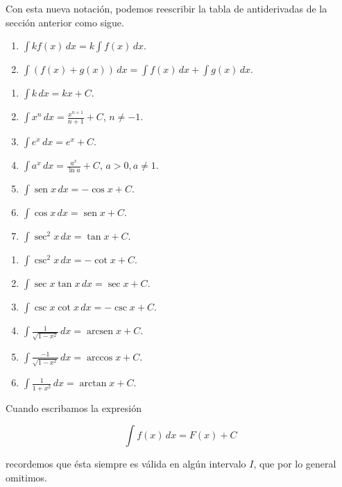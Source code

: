 \documentclass[
  letterpaper,
]{book}
\theoremstyle{plain}
\theoremstyle{remark}
\begin{document}
Con esta nueva notación, podemos reescribir la tabla de antiderivadas de
la sección anterior como sigue.

\label{form-int-indefinidas}
\begin{enumerate}
\def\labelenumi{\arabic{enumi}.}
\item
  \(\displaystyle \int kf(x)\,dx=k\int f(x)\, dx\).
\item
  \(\displaystyle \int (f(x)+g(x))\,dx=\int f(x)\, dx+\int g(x)\,dx\).
\end{enumerate}

\begin{enumerate}
\def\labelenumi{\arabic{enumi}.}
\setcounter{enumi}{2}
\item
  \(\displaystyle \int k\,dx=kx+C\).
\item
  \(\displaystyle \int x^n\,dx=\frac{x^{n+1}}{n+1}+C\), \(n\neq -1\).
\item
  \(\displaystyle \int e^x\,dx=e^x+C.\)
\item
  \(\displaystyle \int a^x\,dx=\frac{a^x}{\ln a}+C\), \(a>0, a\neq 1\).
\item
  \(\displaystyle \int \operatorname{sen} x\,dx=-\cos x+C\).
\item
  \(\displaystyle \int \cos x\,dx=\operatorname{sen} x+C\).
\item
  \(\displaystyle \int \sec^2 x\,dx=\tan x+C\).
\end{enumerate}

\begin{enumerate}
\def\labelenumi{\arabic{enumi}.}
\setcounter{enumi}{9}
\item
  \(\displaystyle \int \csc^2 x\,dx=-\cot x+C\).
\item
  \(\displaystyle \int \sec x\tan x\,dx=\sec x+C\).
\item
  \(\displaystyle \int \csc x\cot x\,dx=-\csc x+C\).
\item
  \(\displaystyle \int \frac{1}{\sqrt{1-x^2}}\,dx=\operatorname{arcsen} x+C\).
\item
  \(\displaystyle \int \frac{-1}{\sqrt{1-x^2}}\,dx=\arccos x+C\).
\item
  \(\displaystyle \int \frac{1}{1+x^2}\,dx=\arctan x+C\).
\end{enumerate}

Cuando escribamos la expresión

\[
\int f(x)\,dx=F(x)+C
\]

recordemos que ésta siempre es válida en algún intervalo \(I\), que por
lo general omitimos.
\end{document}
